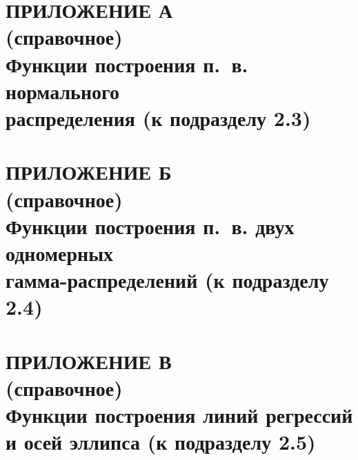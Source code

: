 \renewcommand{\thefigure}{\Asbuk{section}.\arabic{figure}}
\renewcommand{\thetable}{\Asbuk{section}.\arabic{table}}
\renewcommand{\thelstlisting}{\Asbuk{section}.\arabic{lstlisting}}

\pagestyle{fancy}
\fancyhf{} %
\fancyfoot[R]{\thepage}
\renewcommand{\headrulewidth}{0pt}
\renewcommand{\footrulewidth}{0pt}

\setlength{\headheight}{10mm}
\setlength{\headsep}{\baselineskip}

\section*{ПРИЛОЖЕНИЕ А\\(справочное)\\Функции построения п.~в. нормального \\ распределения (к подразделу 2.3)}
\thispagestyle{plain}
\setcounter{section}{1}
\setcounter{figure}{0}
\setcounter{table}{0}
\setcounter{lstlisting}{0}



\setlength{\headheight}{10mm}
\setlength{\headsep}{\baselineskip}


\section*{ПРИЛОЖЕНИЕ Б\\(справочное)\\Функции построения п.~в. двух одномерных \\ гамма-распределений (к подразделу 2.4)} %
\thispagestyle{plain}
\setcounter{section}{2}
\setcounter{figure}{0}
\setcounter{table}{0}
\setcounter{lstlisting}{0}



\setlength{\headheight}{10mm}
\setlength{\headsep}{\baselineskip}

\section*{ПРИЛОЖЕНИЕ В\\(справочное)\\Функции построения линий регрессий \\ и осей эллипса (к подразделу 2.5)}
\thispagestyle{plain}
\setcounter{section}{3}
\setcounter{figure}{0}
\setcounter{table}{0}
\setcounter{lstlisting}{0}


